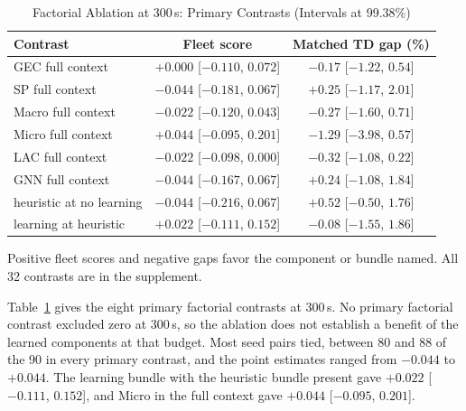 \documentclass{ieeeaccess}
\begin{document}
\begin{table}[!t]
\caption{Factorial Ablation at 300\,s: Primary Contrasts (Intervals at 99.38\%)}
\label{tab:ablation}
\centering
\scriptsize
\setlength{\tabcolsep}{3pt}
\begin{tabular}{l c c}
\toprule
\textbf{Contrast} & \textbf{Fleet score} & \textbf{Matched TD gap (\%)} \\
\midrule
GEC full context & $+0.000$ [$-0.110$, $0.072$] & $-0.17$ [$-1.22$, $0.54$] \\
SP full context & $-0.044$ [$-0.181$, $0.067$] & $+0.25$ [$-1.17$, $2.01$] \\
Macro full context & $-0.022$ [$-0.120$, $0.043$] & $-0.27$ [$-1.60$, $0.71$] \\
Micro full context & $+0.044$ [$-0.095$, $0.201$] & $-1.29$ [$-3.98$, $0.57$] \\
LAC full context & $-0.022$ [$-0.098$, $0.000$] & $-0.32$ [$-1.08$, $0.22$] \\
GNN full context & $-0.044$ [$-0.167$, $0.067$] & $+0.24$ [$-1.08$, $1.84$] \\
heuristic at no learning & $-0.044$ [$-0.216$, $0.067$] & $+0.52$ [$-0.50$, $1.76$] \\
learning at heuristic & $+0.022$ [$-0.111$, $0.152$] & $-0.08$ [$-1.55$, $1.86$] \\
\bottomrule
\end{tabular}

\vspace{2pt}
{\scriptsize Positive fleet scores and negative gaps favor the component or bundle named. All 32 contrasts are in the supplement.\par}
\end{table}

Table~\ref{tab:ablation} gives the eight primary factorial contrasts at 300\,s. No primary factorial contrast excluded zero at 300\,s, so the ablation does not establish a benefit of the learned components at that budget. Most seed pairs tied, between 80 and 88 of the 90 in every primary contrast, and the point estimates ranged from $-0.044$ to $+0.044$. The learning bundle with the heuristic bundle present gave $+0.022$ [$-0.111$, $0.152$], and Micro in the full context gave $+0.044$ [$-0.095$, $0.201$].
\end{document}
